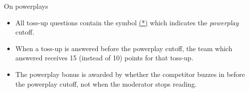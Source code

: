 \vspace*{0.3 cm}
On powerplays
\begin{itemize}
    \item All toss-up questions contain the symbol \underline{(*)} which indicates the \textit{powerplay} cutoff.
    \item When a toss-up is answered before the powerplay cutoff, the team which answered receives 15 (instead of 10) points for that toss-up.
    \item The powerplay bonus is awarded by whether the competitor buzzes in before the powerplay cutoff, not when the moderator stops reading.
\end{itemize}
